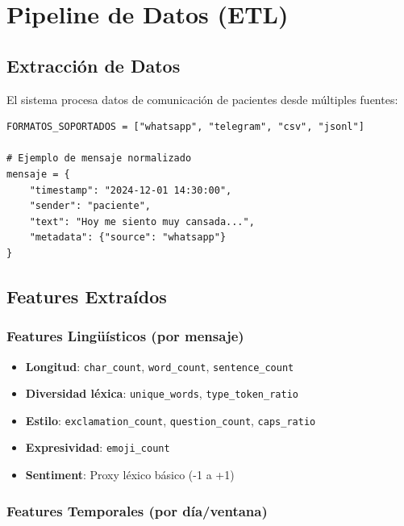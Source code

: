 \documentclass[11pt,a4paper]{article}
\begin{document}
\section{Pipeline de Datos (ETL)}

\subsection{Extracción de Datos}

El sistema procesa datos de comunicación de pacientes desde múltiples fuentes:

\begin{lstlisting}[caption={Formatos de entrada soportados}]
FORMATOS_SOPORTADOS = ["whatsapp", "telegram", "csv", "jsonl"]

# Ejemplo de mensaje normalizado
mensaje = {
    "timestamp": "2024-12-01 14:30:00",
    "sender": "paciente",
    "text": "Hoy me siento muy cansada...",
    "metadata": {"source": "whatsapp"}
}
\end{lstlisting}

\subsection{Features Extraídos}

\subsubsection{Features Lingüísticos (por mensaje)}

\begin{itemize}
    \item \textbf{Longitud}: \texttt{char\_count}, \texttt{word\_count}, \texttt{sentence\_count}
    \item \textbf{Diversidad léxica}: \texttt{unique\_words}, \texttt{type\_token\_ratio}
    \item \textbf{Estilo}: \texttt{exclamation\_count}, \texttt{question\_count}, \texttt{caps\_ratio}
    \item \textbf{Expresividad}: \texttt{emoji\_count}
    \item \textbf{Sentiment}: Proxy léxico básico (-1 a +1)
\end{itemize}

\subsubsection{Features Temporales (por día/ventana)}
\end{document}
